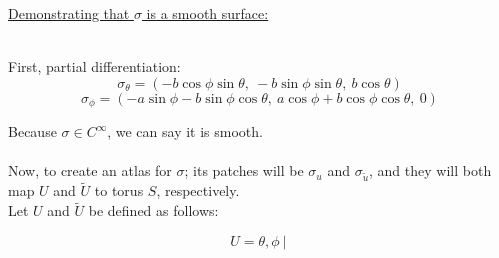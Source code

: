 \documentclass[12pt]{article}
\newcommand{\ulind}[1]
{
\noindent
\underline{#1}\\\\
\indent
}
\begin{document}
\clearpage

\ulind{Demonstrating that $\sigma$ is a smooth surface:}
First, partial differentiation:
$$
\sigma_\theta = (-b \cos \phi \sin \theta, \ -b \sin \phi \sin \theta, \ b \cos \theta )
$$
$$
\sigma_\phi = (-a \sin \phi - b \sin \phi \cos \theta, \ a \cos \phi + b \cos \phi \cos \theta, \ 0 )
$$

Because $\sigma \in C^\infty$, we can say it is smooth.\\\\
Now, to create an atlas for $\sigma$; its patches will be $\sigma_u$ and $\sigma_{\tilde u}$, and they will both map $U$ and $\widetilde{U}$ to torus $S$, respectively.\\
\indent
Let $U$ and $\widetilde{U}$ be defined as follows:

$$
U = {\theta,\phi \ | \ }
$$
\end{document}
